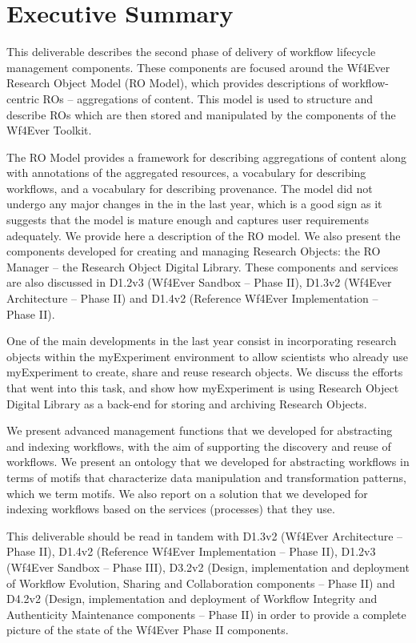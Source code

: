\documentclass[a4paper, twoside, 11pt]{article}
\begin{document}
\section*{Executive Summary}
This deliverable describes the second phase of delivery of workflow
lifecycle management components. These components are focused around
the Wf4Ever Research Object Model (RO Model), which provides
descriptions of workflow-centric ROs -- aggregations of content. This
model is used to structure and describe ROs which are then stored and
manipulated by the components of the Wf4Ever Toolkit.

The RO Model provides a framework for describing aggregations of
content along with annotations of the aggregated resources, a
vocabulary for describing workflows, and a vocabulary for describing
provenance. The model did not undergo any major changes in the in the last year, which is a good sign as it suggests that the model is mature enough and captures user requirements adequately. 
We provide here a description of the RO model.
We also present the components developed for creating and managing Research Objects: the
RO Manager -- the
Research Object Digital Library. These components and services are also discussed in D1.2v3
(Wf4Ever Sandbox -- Phase II), D1.3v2 (Wf4Ever Architecture -- Phase
II) and D1.4v2 (Reference Wf4Ever Implementation -- Phase II). 

One of the main developments in the last year consist in incorporating research objects within the myExperiment environment to allow scientists who already use myExperiment to create, share and reuse research objects. We discuss the efforts that went into this task, and show how myExperiment is using Research Object Digital Library as a back-end for storing and archiving Research Objects.

We  present advanced management functions that we developed for abstracting and indexing workflows, with the aim of supporting the discovery and reuse of workflows. We present an ontology that we developed for abstracting workflows in terms of motifs that characterize data manipulation and transformation patterns, which we term motifs. We also report on a solution that we developed for indexing workflows based on the services (processes) that they use.

This deliverable should be read in tandem with D1.3v2 (Wf4Ever
Architecture -- Phase II), D1.4v2 (Reference Wf4Ever Implementation --
Phase II), D1.2v3 (Wf4Ever Sandbox -- Phase III), D3.2v2 (Design,
implementation and deployment of Workflow Evolution, Sharing and
Collaboration components -- Phase II) and D4.2v2 (Design,
implementation and deployment of Workflow Integrity and Authenticity
Maintenance components -- Phase II) in order to provide a complete
picture of the state of the Wf4Ever Phase II components.
\end{document}
